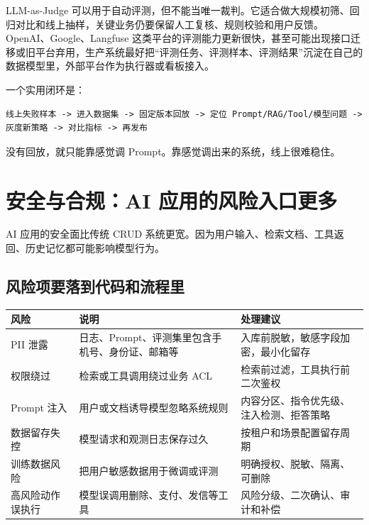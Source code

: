 \documentclass[9pt,a4paper,twocolumn]{ctexart}
\begin{document}
LLM-as-Judge 可以用于自动评测，但不能当唯一裁判。它适合做大规模初筛、回归对比和线上抽样，关键业务仍要保留人工复核、规则校验和用户反馈。OpenAI、Google、Langfuse 这类平台的评测能力更新很快，甚至可能出现接口迁移或旧平台弃用，生产系统最好把“评测任务、评测样本、评测结果”沉淀在自己的数据模型里，外部平台作为执行器或看板接入。



一个实用闭环是：



\begin{lstlisting}
线上失败样本 -> 进入数据集 -> 固定版本回放 -> 定位 Prompt/RAG/Tool/模型问题 -> 灰度新策略 -> 对比指标 -> 再发布
\end{lstlisting}



没有回放，就只能靠感觉调 Prompt。靠感觉调出来的系统，线上很难稳住。



\section*{安全与合规：AI 应用的风险入口更多}


AI 应用的安全面比传统 CRUD 系统更宽。因为用户输入、检索文档、工具返回、历史记忆都可能影响模型行为。



\subsection*{风险项要落到代码和流程里}

{\footnotesize
\begin{tabular}{|p{}|p{}|p{}|}
\hline
\textbf{风险} & \textbf{说明} & \textbf{处理建议} \\
\hline
PII 泄露 & 日志、Prompt、评测集里包含手机号、身份证、邮箱等 & 入库前脱敏，敏感字段加密，最小化留存 \\
\hline
权限绕过 & 检索或工具调用绕过业务 ACL & 检索前过滤，工具执行前二次鉴权 \\
\hline
Prompt 注入 & 用户或文档诱导模型忽略系统规则 & 内容分区、指令优先级、注入检测、拒答策略 \\
\hline
数据留存失控 & 模型请求和观测日志保存过久 & 按租户和场景配置留存周期 \\
\hline
训练数据风险 & 把用户敏感数据用于微调或评测 & 明确授权、脱敏、隔离、可删除 \\
\hline
高风险动作误执行 & 模型误调用删除、支付、发信等工具 & 风险分级、二次确认、审计和补偿 \\
\hline
\end{tabular}
}
\end{document}
